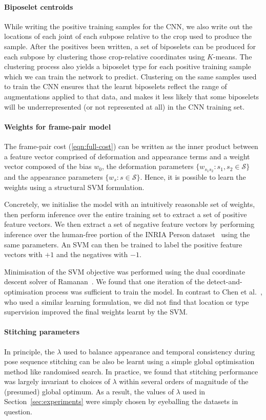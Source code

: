 \documentclass[runningheads]{llncs}
\begin{document}
\paragraph{Biposelet centroids} While writing the positive training samples for
the CNN, we also write out the locations of each joint of each subpose relative
to the crop used to produce the sample. After the positives been written, a set
of biposelets can be produced for each subpose by clustering those crop-relative
coordinates using $K$-means. The clustering process also yields a biposelet type
for each positive training sample which we can train the network to predict.
Clustering on the same samples used to train the CNN ensures that the learnt
biposelets reflect the range of augmentations applied to that data, and makes it
less likely that some biposelets will be underrepresented (or not represented at
all) in the CNN training set.

\paragraph{Weights for frame-pair model} The frame-pair cost
(\ref{eqn:full-cost}) can be written as the inner product between a feature
vector comprised of deformation and appearance terms and a weight vector
composed of the bias $w_0$, the deformation parameters $\{w_{s_1 s_2} : s_1, s_2
\in \mathcal S\}$ and the appearance parameters $\{w_s : s \in \mathcal S\}$.
Hence, it is possible to learn the weights using a structural SVM formulation.

Concretely, we initialise the model with an intuitively reasonable set of
weights, then perform inference over the entire training set to extract a set of
positive feature vectors. We then extract a set of negative feature vectors by
performing inference over the human-free portion of the INRIA Person
dataset~\cite{dalal2005histograms} using the same parameters. An SVM can then be
trained to label the positive feature vectors with $+1$ and the negatives with
$-1$.

Minimisation of the SVM objective was performed using the dual coordinate
descent solver of Ramanan~\cite{ramanan2013dual}. We found that one iteration of
the detect-and-optimisation process was sufficient to train the model. In
contrast to Chen et al.~\cite{chen2014articulated}, who used a similar learning
formulation, we did not find that location or type supervision improved the
final weights learnt by the SVM.%

\paragraph{Stitching parameters} In principle, the $\lambda$ used to balance
appearance and temporal consistency during pose sequence stitching can be also
be learnt using a simple global optimisation method like randomised search. In
practice, we found that stitching performance was largely invariant to choices
of $\lambda$ within several orders of magnitude of the (presumed) global
optimum. As a result, the values of $\lambda$ used in
Section~\ref{sec:experiments} were simply chosen by eyeballing the datasets in
question.
\end{document}
